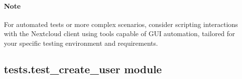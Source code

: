 \documentclass[letterpaper,10pt,english]{sphinxmanual}
\begin{document}
\paragraph{Note}
\label{\detokenize{tests:note}}
\sphinxAtStartPar
For automated tests or more complex scenarios, consider scripting interactions with the Nextcloud client using tools capable of GUI automation, tailored for your specific testing environment and requirements.


\subsection{tests.test\_create\_user module}
\label{\detokenize{tests:module-tests.test_create_user}}\label{\detokenize{tests:tests-test-create-user-module}}
\end{document}
